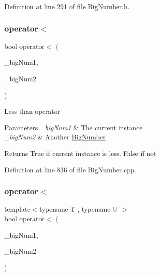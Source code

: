 Definition at line 291 of file Big\+Number.\+h.

\mbox{\label{class_big_nums_1_1_big_number_a5908b93d7477c482d145b878fa003101}} 
\subsubsection{\texorpdfstring{operator$<$}{operator<}\hspace{0.1cm}{\footnotesize\ttfamily [1/2]}}
{\footnotesize\ttfamily bool operator$<$ (\begin{DoxyParamCaption}\item[{const \mbox{\hyperlink{class_big_nums_1_1_big_number}{Big\+Number}} \&}]{\+\_\+big\+Num1,  }\item[{const \mbox{\hyperlink{class_big_nums_1_1_big_number}{Big\+Number}} \&}]{\+\_\+big\+Num2 }\end{DoxyParamCaption})\hspace{0.3cm}{\ttfamily [friend]}}

Less than operator 
\begin{DoxyParams}{Parameters}
{\em \+\_\+big\+Num1} & The current instance \\
\hline
{\em \+\_\+big\+Num2} & Another \mbox{\hyperlink{class_big_nums_1_1_big_number}{Big\+Number}} \\
\hline
\end{DoxyParams}
\begin{DoxyReturn}{Returns}
True if current instance is less, False if not 
\end{DoxyReturn}


Definition at line 836 of file Big\+Number.\+cpp.

\mbox{\label{class_big_nums_1_1_big_number_a8d081ba4f8cf93e90d74dbe013695b1c}} 
\subsubsection{\texorpdfstring{operator$<$}{operator<}\hspace{0.1cm}{\footnotesize\ttfamily [2/2]}}
{\footnotesize\ttfamily template$<$typename T , typename U $>$ \\
bool operator$<$ (\begin{DoxyParamCaption}\item[{const T \&}]{\+\_\+big\+Num1,  }\item[{const U \&}]{\+\_\+big\+Num2 }\end{DoxyParamCaption})\hspace{0.3cm}{\ttfamily [friend]}}



